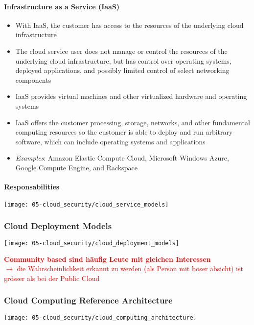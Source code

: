 \paragraph{Infrastructure as a Service (IaaS)}
\begin{itemize}
    \item With IaaS, the customer has access to the resources of the underlying cloud infrastructure
    \item The cloud service user does not manage or control the resources of the underlying cloud infrastructure, but has control over operating systems, deployed applications, and possibly limited control of select networking components
    \item IaaS provides virtual machines and other virtualized hardware and operating systems
    \item IaaS offers the customer processing, storage, networks, and other fundamental computing resources so the customer is able to deploy and run arbitrary software, which can include operating systems and applications
    \item \textit{Examples}: Amazon Elastic Compute Cloud, Microsoft Windows Azure, Google Compute Engine, and Rackspace
\end{itemize}

\paragraph{Responsabilities}
\begin{center}
    \texttt{[image: 05-cloud\_security/cloud\_service\_models]}
    \vspace{-8pt}
\end{center}

\subsubsection{Cloud Deployment Models}
\begin{center}
    \texttt{[image: 05-cloud\_security/cloud\_deployment\_models]}
    \vspace{-8pt}
\end{center}

\textcolor{red}{\textbf{Community based sind häufig Leute mit gleichen Interessen}\\
$\rightarrow$ die Wahrscheinlichkeit erkannt zu werden (als Person mit böser absicht) ist grösser als bei der Public Cloud}

\subsubsection{Cloud Computing Reference Architecture}
\begin{center}
    \texttt{[image: 05-cloud\_security/cloud\_computing\_architecture]}
    \vspace{-8pt}
\end{center}

